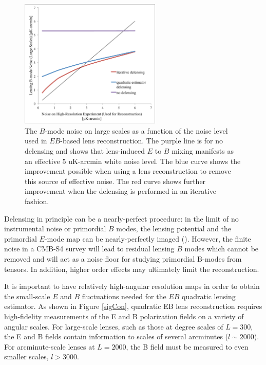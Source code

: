 \begin{figure}[htbp]
\centering
\includegraphics[width=0.60\textwidth]{CMBLensing/delensPlot.pdf}
\vspace{0.3cm}
\caption{The $B$-mode noise on large scales as a function of the noise level used in $EB$-based lens reconstruction.  The purple line is for no delensing and shows that lens-induced  $E$ to $B$ mixing manifests as an effective 5 uK-arcmin white noise level.  The blue curve shows the improvement possible when using a lens reconstruction to remove this source of effective noise.  The red curve shows further improvement when the delensing is performed in an iterative fashion.}
\label{iterative}
\end{figure}

Delensing in principle can be a nearly-perfect procedure: in the limit of no instrumental noise or primordial $B$ modes, the lensing potential and the primordial $E$-mode map can be nearly-perfectly imaged (\cite{Hirata:2003ka}).  However, the finite noise in a CMB-S4 survey will lead to residual lensing $B$ modes which cannot be removed and will act as a noise floor for studying primordial B-modes from tensors.  In addition, higher order effects may ultimately limit the reconstruction.


It is important to have relatively high-angular resolution maps in order to obtain the small-scale $E$ and $B$ fluctuations needed for the $EB$ quadratic lensing estimator.  As shown in Figure \ref{sigCon}, quadratic EB lens reconstruction requires high-fidelity measurements of the E and B polarization fields on a variety of angular scales.  For large-scale lenses, such as those at degree scales of $L=300$, the E and B fields contain information to scales of several arcminutes ($l \sim 2000$).  For arcminute-scale lenses at $L = 2000$, the B field must be measured to even smaller scales, $l > 3000$. 

